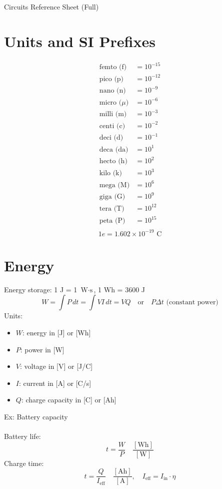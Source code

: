 \documentclass[12pt]{article}
\title{}
\date{}
\author{}
\begin{document}
{\centering\LARGE Circuits Reference Sheet (Full)\par}\noindent
\section*{Units and SI Prefixes}
\makeatletter
\@fleqnfalse
\makeatother
\[\begin{aligned}
\text{femto (f)}  &= 10^{-15} \\
\text{pico (p)}   &= 10^{-12} \\
\text{nano (n)}   &= 10^{-9} \\
\text{micro ($\mu$)}  &= 10^{-6} \\
\text{milli (m)}  &= 10^{-3} \\
\text{centi (c)}  &= 10^{-2} \\
\text{deci (d)}   &= 10^{-1} \\
\text{deca (da)}  &= 10^{1} \\
\text{hecto (h)}  &= 10^{2} \\
\text{kilo (k)}   &= 10^{3} \\
\text{mega (M)}   &= 10^{6} \\
\text{giga (G)}   &= 10^{9} \\
\text{tera (T)}   &= 10^{12} \\
\text{peta (P)}   &= 10^{15} \\
\end{aligned}\]
\makeatletter
\@fleqntrue
\makeatother
\[1 e = 1.602 \times 10^{-19} \text{ C}\]
\newpage
\section*{Energy}
Energy storage: 1 J = 1 $\text{W}\cdot\text{s}$, 1 Wh = 3600 J
\[W = \int P\,dt = \int VI\, dt = VQ\quad \text{or} \quad P\Delta t \text{ (constant power)}\]
Units:
\begin{itemize}
    \item $W$: energy in [J] or [Wh]
    \item $P$: power in [W]
    \item $V$: voltage in [V] or [J/C]
    \item $I$: current in [A] or [C/s]
    \item $Q$: charge capacity in [C] or [Ah]
\end{itemize}
Ex: Battery capacity\\\\
Battery life: 
\[t=\frac{W}{P}\quad \frac{[\text{Wh}]}{[\text{W}]}\]
Charge time:
\[t=\frac{Q}{I_\text{eff}}\quad \frac{[\text{Ah}]}{[\text{A}]}, \quad I_\text{eff} = I_\text{in}\cdot \eta\]
\end{document}
